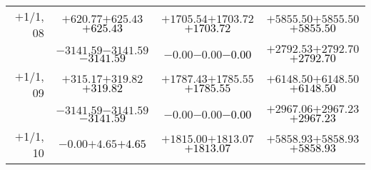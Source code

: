 \documentclass[compress]{beamer}
\begin{document}
\begin{frame}
{\begin{tabular}{r | c | c | c}
$+$1/1, 08 & $+620.77$\hspace{0.1 cm}$+625.43$\hspace{0.1 cm}\textcolor{black}{$+625.43$} & $+1705.54$\hspace{0.1 cm}$+1703.72$\hspace{0.1 cm}\textcolor{black}{$+1703.72$} & $+5855.50$\hspace{0.1 cm}$+5855.50$\hspace{0.1 cm}\textcolor{black}{$+5855.50$} \\
           & $-3141.59$\hspace{0.1 cm}$-3141.59$\hspace{0.1 cm}\textcolor{black}{$-3141.59$} & $-0.00$\hspace{0.1 cm}$-0.00$\hspace{0.1 cm}\textcolor{black}{$-0.00$} & $+2792.53$\hspace{0.1 cm}$+2792.70$\hspace{0.1 cm}\textcolor{black}{$+2792.70$} \\
$+$1/1, 09 & $+315.17$\hspace{0.1 cm}$+319.82$\hspace{0.1 cm}\textcolor{black}{$+319.82$} & $+1787.43$\hspace{0.1 cm}$+1785.55$\hspace{0.1 cm}\textcolor{black}{$+1785.55$} & $+6148.50$\hspace{0.1 cm}$+6148.50$\hspace{0.1 cm}\textcolor{black}{$+6148.50$} \\
           & $-3141.59$\hspace{0.1 cm}$-3141.59$\hspace{0.1 cm}\textcolor{black}{$-3141.59$} & $-0.00$\hspace{0.1 cm}$-0.00$\hspace{0.1 cm}\textcolor{black}{$-0.00$} & $+2967.06$\hspace{0.1 cm}$+2967.23$\hspace{0.1 cm}\textcolor{black}{$+2967.23$} \\
$+$1/1, 10 & $-0.00$\hspace{0.1 cm}$+4.65$\hspace{0.1 cm}\textcolor{black}{$+4.65$} & $+1815.00$\hspace{0.1 cm}$+1813.07$\hspace{0.1 cm}\textcolor{black}{$+1813.07$} & $+5858.93$\hspace{0.1 cm}$+5858.93$\hspace{0.1 cm}\textcolor{black}{$+5858.93$} \\

\end{tabular}}
\end{frame}
\end{document}
